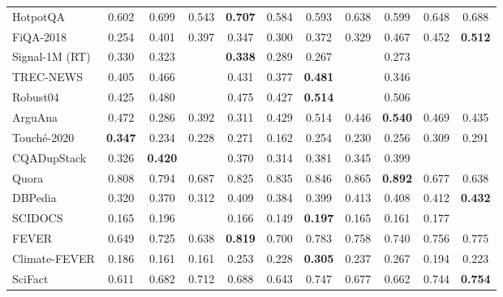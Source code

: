 \documentclass{article}
\begin{document}
\begin{table*}[t!]
{\begin{tabular}{l | c c | c | c c c | c c c c }
    HotpotQA & 0.602 & 0.699
    & 0.543
    & \textbf{0.707} & 0.584 & 0.593
& 0.638 & 0.599 & 0.648 & 0.688 \\ 
    
    FiQA-2018 & 0.254 & 0.401
    & 0.397
    & 0.347 & 0.300 & 0.372
& 0.329 & 0.467 & 0.452 & \textbf{0.512} \\ \midrule
   
    Signal-1M (RT) & 0.330 & 0.323
    & 
    & \textbf{0.338} & 0.289 & 0.267
& & 0.273 & & \\ \midrule
    
    TREC-NEWS & 0.405 & 0.466
    & 
    & 0.431 & 0.377 & \textbf{0.481}
& & 0.346 & & \\
    
    Robust04 & 0.425 & 0.480
    & 
    & 0.475 & 0.427 & \textbf{0.514}
& & 0.506 & & \\ \midrule
    
    ArguAna & 0.472 & 0.286
    & 0.392
    & 0.311 & 0.429 & 0.514
& 0.446 & \textbf{0.540} & 0.469 & 0.435 \\  
    
    Touché-2020 & \textbf{0.347} & 0.234
    & 0.228
    & 0.271 & 0.162 & 0.254
& 0.230 & 0.256 & 0.309 & 0.291 \\ \midrule 
    
    CQADupStack & 0.326 & \textbf{0.420}
    & 
    & 0.370 & 0.314 & 0.381
& 0.345 & 0.399 & & \\
   
    Quora & 0.808 & 0.794
    & 0.687
    & 0.825 & 0.835 & 0.846
& 0.865 & \textbf{0.892} & 0.677 & 0.638 \\ \midrule
    
    DBPedia & 0.320 & 0.370
    & 0.312
    & 0.409 & 0.384 & 0.399
& 0.413 & 0.408 & 0.412 & \textbf{0.432} \\ \midrule
   
    SCIDOCS & 0.165 & 0.196
    & 
    & 0.166 & 0.149 & \textbf{0.197}
& 0.165 & 0.161 & 0.177 & \\ \midrule
   
    FEVER & 0.649 & 0.725
    & 0.638
    & \textbf{0.819} & 0.700 & 0.783
& 0.758 & 0.740 & 0.756 & 0.775 \\ 
    
    Climate-FEVER & 0.186 & 0.161
    & 0.161
    & 0.253 & 0.228 & \textbf{0.305}
& 0.237 & 0.267 & 0.194 & 0.223 \\ 
    
    SciFact & 0.611 & 0.682
    & 0.712
    & 0.688 & 0.643 & 0.747
& 0.677 & 0.662 & 0.744 & \textbf{0.754} \\ \midrule
   

\end{tabular}}
\end{table*}
\end{document}
